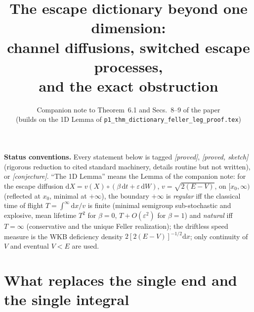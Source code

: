 \documentclass[11pt]{article}
\title{The escape dictionary beyond one dimension:\\
channel diffusions, switched escape processes,\\ and the exact
obstruction}
\author{Companion note to Theorem~6.1 and Secs.~8--9 of the paper\\
(builds on the 1D Lemma of
\texttt{p1\_thm\_dictionary\_feller\_leg\_proof.tex})}
\date{}
\theoremstyle{remark}
\newcommand{\dd}{\mathrm{d}}
\begin{document}
\maketitle

\noindent\textbf{Status conventions.}  Every statement below is tagged
\emph{[proved]}, \emph{[proved, sketch]} (rigorous reduction to cited
standard machinery, details routine but not written), or
\emph{[conjecture]}.  ``The 1D Lemma'' means the Lemma of the companion
note: for the escape diffusion
$\dd X=v(X)\circ(\beta\,\dd t+\varepsilon\,\dd W)$,
$v=\sqrt{2(E-V)}$, on $[x_{0},\infty)$ (reflected at $x_{0}$, minimal
at $+\infty$), the boundary $+\infty$ is \emph{regular} iff the
classical time of flight $T=\int^{\infty}\dd x/v$ is finite (minimal
semigroup sub-stochastic and explosive, mean lifetime
$T^{2}$ for $\beta=0$, $T+O(\varepsilon^{2})$ for $\beta=1$) and
\emph{natural} iff $T=\infty$ (conservative and the unique Feller
realization); the driftless speed measure is the WKB deficiency
density $2[2(E-V)]^{-1/2}\dd x$; only continuity of $V$ and eventual
$V<E$ are used.

\section{What replaces the single end and the single integral}
\label{sec:setting}
\end{document}
